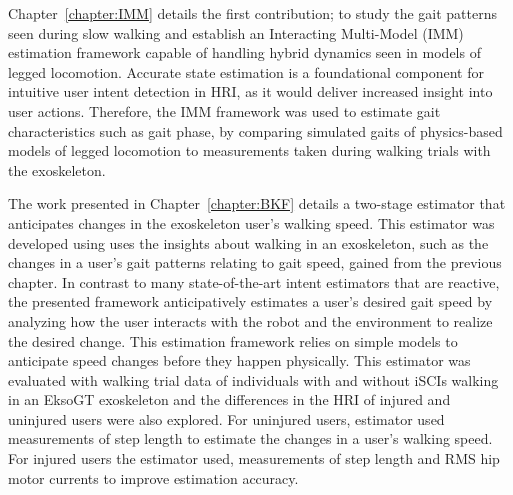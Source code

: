Chapter~\ref{chapter:IMM} details the first contribution; to study the gait patterns seen during slow walking and establish an Interacting Multi-Model (IMM) estimation framework capable of handling hybrid dynamics seen in models of legged locomotion. Accurate state estimation is a foundational component for intuitive user intent detection in HRI, as it would deliver increased insight into user actions. Therefore, the IMM framework was used to estimate gait characteristics such as gait phase, by comparing simulated gaits of physics-based models of legged locomotion to measurements taken during walking trials with the exoskeleton. 

The work presented in Chapter~\ref{chapter:BKF} details a two-stage estimator that anticipates changes in the exoskeleton user’s walking speed. This estimator was developed using  uses the insights about walking in an exoskeleton, such as the changes in a user's gait patterns relating to gait speed, gained from the previous chapter. In contrast to many state-of-the-art intent estimators that are reactive, the presented framework anticipatively estimates a user's desired gait speed by analyzing how the user interacts with the robot and the environment to realize the desired change. This estimation framework relies on simple models to anticipate speed changes before they happen physically. This estimator was evaluated with walking trial data of individuals with and without iSCIs walking in an EksoGT exoskeleton and the differences in the HRI of injured and uninjured users were also explored. For uninjured users, estimator used measurements of step length to estimate the changes in a user's walking speed. For injured users the estimator used, measurements of step length and RMS hip motor currents to improve estimation accuracy.

